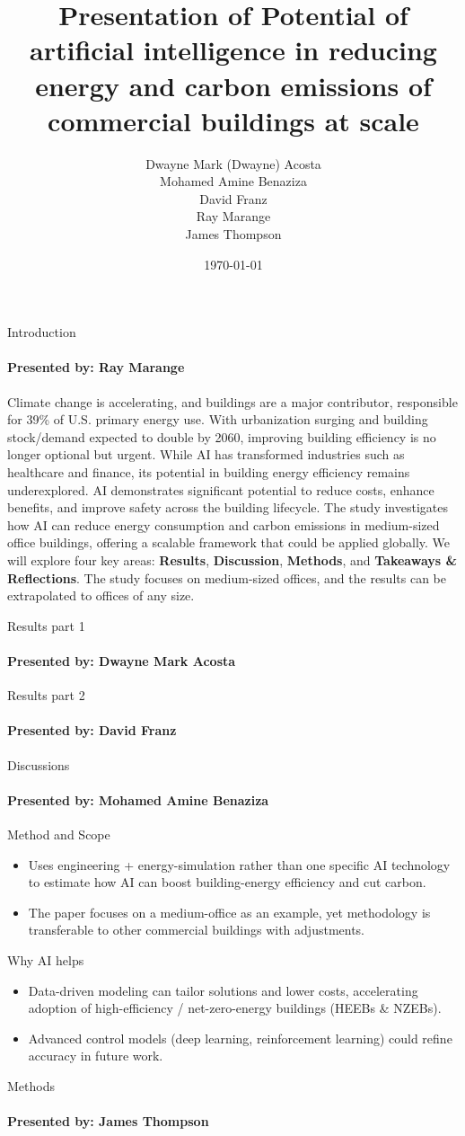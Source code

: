 \documentclass{beamer}
\title{Presentation of Potential of artificial intelligence in reducing energy and carbon emissions of commercial buildings at scale}
\author{Dwayne Mark (Dwayne) Acosta \\ Mohamed Amine Benaziza \\ David Franz \\ Ray Marange \\ James Thompson}
\date{\today}
\begin{document}
\frame{\titlepage}

\begin{frame}{Introduction}
\framesubtitle{Presented by: Ray Marange}
Climate change is accelerating, and buildings are a major contributor, responsible for 39\% of U.S. primary energy use. With urbanization surging and building stock/demand expected to double by 2060, improving building efficiency is no longer optional but urgent.
While AI has transformed industries such as healthcare and finance, its potential in building energy efficiency remains underexplored. AI demonstrates significant potential to reduce costs, enhance benefits, and improve safety across the building lifecycle. The study investigates how AI can reduce energy consumption and carbon emissions in medium-sized office buildings, offering a scalable framework that could be applied globally.
We will explore four key areas: \textbf{Results}, \textbf{Discussion}, \textbf{Methods}, and \textbf{Takeaways \& Reflections}. The study focuses on medium-sized offices, and the results can be extrapolated to offices of any size.
\end{frame}

\begin{frame}{Results part 1}
\framesubtitle{Presented by: Dwayne Mark Acosta}

\end{frame}

\begin{frame}{Results part 2}
\framesubtitle{Presented by: David Franz}


\end{frame}

\begin{frame}{Discussions}
\framesubtitle{Presented by: Mohamed Amine Benaziza}

Method and Scope
\begin{itemize}
    \item Uses engineering + energy-simulation rather than one specific AI technology to estimate how AI can boost building-energy efficiency and cut carbon.
    \item The paper focuses on a medium-office as an example, yet methodology is transferable to other commercial buildings with adjustments.
\end{itemize}
\pause %
Why AI helps
\begin{itemize}[<+->] %
    \item Data-driven modeling can tailor solutions and lower costs, accelerating adoption of high-efficiency / net-zero-energy buildings (HEEBs \& NZEBs).
    \item Advanced control models (deep learning, reinforcement learning) could refine accuracy in future work.
\end{itemize}

\end{frame}

\begin{frame}{Methods}
\framesubtitle{Presented by: James Thompson}

\end{frame}
\end{document}

